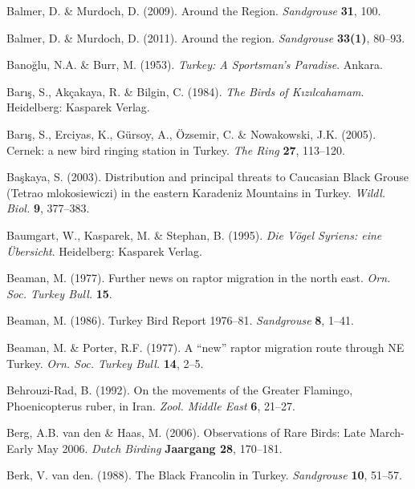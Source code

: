 \documentclass[
  a4paper,
  DIV=11,
  numbers=noendperiod]{scrreprt}
\newlength{\cslhangindent}
\newenvironment{CSLReferences}[2] %
 {\begin{list}{}{%
  \setlength{\itemindent}{0pt}
  \setlength{\leftmargin}{0pt}
  \setlength{\parsep}{0pt}
  \ifodd #1
   \setlength{\leftmargin}{\cslhangindent}
   \setlength{\itemindent}{-1\cslhangindent}
  \fi
  \setlength{\itemsep}{#2\baselineskip}}}
 {\end{list}}
\begin{document}
\begin{CSLReferences}{1}{1}
Balmer, D. \& Murdoch, D. (2009). {Around the Region}. \emph{Sandgrouse}
\textbf{31}, 100.

Balmer, D. \& Murdoch, D. (2011). {Around the region}. \emph{Sandgrouse}
\textbf{33(1)}, 80--93.

Banoğlu, N.A. \& Burr, M. (1953). \emph{{Turkey: A Sportsman's
Paradise}}. Ankara.

Barış, S., Akçakaya, R. \& Bilgin, C. (1984). \emph{{The Birds of
Kızılcahamam}}. Heidelberg: Kasparek Verlag.

Barış, S., Erciyas, K., Gürsoy, A., Özsemir, C. \& Nowakowski, J.K.
(2005). {Cernek: a new bird ringing station in Turkey}. \emph{The Ring}
\textbf{27}, 113--120.

Başkaya, S. (2003). {Distribution and principal threats to Caucasian
Black Grouse ({Tetrao mlokosiewiczi}) in the eastern Karadeniz Mountains
in Turkey}. \emph{Wildl. Biol.} \textbf{9}, 377--383.

Baumgart, W., Kasparek, M. \& Stephan, B. (1995). \emph{{Die Vögel
Syriens: eine Übersicht}}. Heidelberg: Kasparek Verlag.

Beaman, M. (1977). {Further news on raptor migration in the north east}.
\emph{Orn. Soc. Turkey Bull.} \textbf{15}.

Beaman, M. (1986). {Turkey Bird Report 1976--81}. \emph{Sandgrouse}
\textbf{8}, 1--41.

Beaman, M. \& Porter, R.F. (1977). {A {``new''} raptor migration route
through NE Turkey}. \emph{Orn. Soc. Turkey Bull.} \textbf{14}, 2--5.

Behrouzi-Rad, B. (1992). {On the movements of the Greater Flamingo,
{Phoenicopterus ruber}, in Iran}. \emph{Zool. Middle East} \textbf{6},
21--27.

Berg, A.B. van den \& Haas, M. (2006). {Observations of Rare Birds: Late
March-Early May 2006}. \emph{Dutch Birding} \textbf{Jaargang 28},
170--181.

Berk, V. van den. (1988). {The Black Francolin in Turkey}.
\emph{Sandgrouse} \textbf{10}, 51--57.


\end{CSLReferences}
\end{document}
